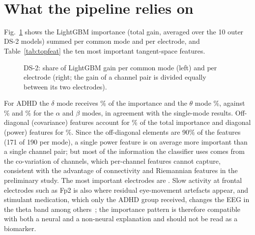 \begin{table}[H]
\caption{The proposed pipeline (fixed configuration) under window-wise and subject-wise
cross-validation: balanced window accuracy (\%).}
\label{tab:gapmain}\centering
{}\\[2pt]
{\footnotesize \dstwonote}
\end{table}

\section{What the pipeline relies on}
Fig.~\ref{fig:importance} shows the LightGBM importance (total gain, averaged over the 10 outer
DS-2 models) summed per common mode and per electrode, and Table~\ref{tab:topfeat} the ten most
important tangent-space features.

\begin{figure}[H]\centering
{}
\caption{DS-2: share of LightGBM gain per common mode (left) and per electrode (right; the gain
of a channel pair is divided equally between its two electrodes).}
\label{fig:importance}
\end{figure}

\begin{table}[H]
\caption{DS-2: the ten most important tangent-space features of the proposed pipeline. A
``variance'' feature is a diagonal element (power of one channel in the mode), a ``covariance''
feature an off-diagonal element (co-variation of two channels).}
\label{tab:topfeat}\centering
{}
\end{table}

For ADHD the $\delta$ mode receives \% of the importance and the $\theta$ mode
\%, against \% and \% for the $\alpha$ and $\beta$
modes, in agreement with the single-mode results. Off-diagonal (covariance) features account for
\% of the total importance and diagonal (power) features for
\%. Since the off-diagonal elements are 90\% of the features (171 of 190 per
mode), a single power feature is on average more important than a single channel pair; but most
of the information the classifier uses comes from the co-variation of channels, which per-channel
features cannot capture, consistent with the advantage of connectivity and Riemannian features in
the preliminary study. The most important electrodes are . Slow activity at frontal electrodes such as Fp2
is also where residual eye-movement artefacts appear, and stimulant medication, which only the
ADHD group received, changes the EEG in the theta band among others~\cite{clarke2002}; the
importance pattern is therefore compatible with both a neural and a non-neural explanation and
should not be read as a biomarker.

